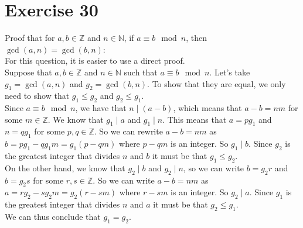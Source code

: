 \documentclass[12pt]{article}
\newcommand{\N}{\mathbb{N}}
\newcommand{\Z}{\mathbb{Z}}
\begin{document}
    \section*{Exercise 30}
    Proof that for $a, b \in \Z$ and $n \in \N$,
    if $a \equiv b \mod n$,
    then $\gcd(a, n) = \gcd(b, n)$: \\
    For this question, it is easier to use a direct proof. \\
    Suppose that $a, b \in \Z$ and $n \in \N$
    such that $a \equiv b \mod n$.
    Let's take $g_1 = \gcd(a, n)$ and $g_2 = \gcd(b, n)$.
    To show that they are equal,
    we only need to show that $g_1 \leqslant g_2$
    and $g_2 \leqslant g_1$. \\
    Since $a \equiv b \mod n$,
    we have that $n \mid (a-b)$,
    which means that $a-b = nm$
    for some $m \in \Z$.
    We know that $g_1 \mid a$ and $g_1 \mid n$.
    This means that $a = pg_1$ and $n = qg_1$
    for some $p, q \in \Z$.
    So we can rewrite $a-b = nm$
    as $b = pg_1 - qg_1m = g_1(p - qm)$
    where $p - qm$ is an integer.
    So $g_1 \mid b$.
    Since $g_2$ is the greatest integer that
    divides $n$ and $b$
    it must be that $g_1 \leqslant g_2$. \\
    On the other hand, 
    we know that $g_2 \mid b$ and $g_2 \mid n$,
    so we can write $b = g_2r$ and $b = g_2s$
    for some $r, s \in \Z$. 
    So we can write $a-b = nm$
    as $a = rg_2 - sg_2m = g_2(r - sm)$
    where $r - sm$ is an integer.
    So $g_2 \mid a$.
    Since $g_1$ is the greatest integer that
    divides $n$ and $a$
    it must be that $g_2 \leqslant g_1$. \\
    We can thus conclude that $g_1 = g_2$. \\
\end{document}
